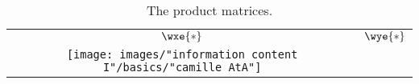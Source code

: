 \begin{table}[htdp]
\caption[The product matrices]{The product matrices.}
\begin{center}
\begin{tabular}{cc}
%
  $\wxe{*}$ & $\wye{*}$ \\
%
\texttt{[image: images/"information content I"/basics/"camille AtA"]} &
\raisebox{-0.18\height}{\includegraphics[ width = 1.5in ] {images/"information content I"/basics/"camille AAt"}} 
%
\end{tabular}
\end{center}
\label{tab:camille product matrices}
\end{table}

\endinput